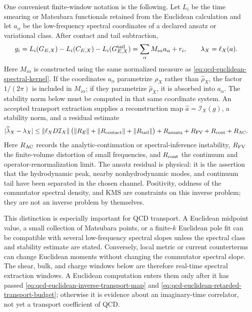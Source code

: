 \begin{controlledapproximation}
One convenient finite-window notation is the following.  Let \(L_i\) be the
time smearing or Matsubara functionals retained from the Euclidean
calculation and let \(a_\alpha\) be the low-frequency spectral coordinates
of a declared ansatz or variational class.  After contact and tail
subtraction,
\begin{equation}
  g_i
  =
  L_i(G_{E,X})-L_i(C_{E,X})-L_i(G_{E,X}^{\rm tail})
  =
  \sum_\alpha M_{i\alpha}a_\alpha+r_i,
  \qquad
  \lambda_X=\ell_X(a).
  \label{eq:qcd-euclidean-inverse-transport-map}
\end{equation}
Here \(M_{i\alpha}\) is constructed using the same normalized measure as
\eqref{eq:qcd-euclidean-spectral-kernel}.  If the coordinates \(a_\alpha\)
parametrize \(\rho_X\) rather than \(\widehat\rho_X\), the factor
\(1/(2\pi)\) is included in \(M_{i\alpha}\); if they parametrize
\(\widehat\rho_X\), it is absorbed into \(a_\alpha\).  The stability norm below
must be computed in that same coordinate system.
An accepted transport extraction supplies a reconstruction map
\(\widehat a=\mathcal I_X(g)\), a stability norm, and a residual estimate
\begin{equation}
  |\widehat\lambda_X-\lambda_X|
  \le
  \|\ell_X D\mathcal I_X\|\,
  \bigl(
    \|R_E\|+\|R_{\rm contact}\|+\|R_{\rm tail}\|
  \bigr)
  +
  R_{\rm ansatz}+R_{\rm FV}+R_{\rm cont}+R_{\rm AC}.
  \label{eq:qcd-euclidean-retarded-transport-budget}
\end{equation}
Here \(R_{\rm AC}\) records the analytic-continuation or spectral-inference
instability, \(R_{\rm FV}\) the finite-volume distortion of small
frequencies, and \(R_{\rm cont}\) the continuum and operator-renormalization
limit.  The ansatz residual is physical: it is the assertion that the
hydrodynamic peak, nearby nonhydrodynamic modes, and continuum tail have been
separated in the chosen channel.  Positivity, oddness of the commutator
spectral density, and KMS are constraints on this inverse problem; they are
not an inverse problem by themselves.

This distinction is especially important for QCD transport.  A Euclidean
midpoint value, a small collection of Matsubara points, or a finite-\(k\)
Euclidean pole fit can be compatible with several low-frequency spectral
slopes unless the spectral class and stability estimate are stated.
Conversely, local metric or current counterterms can change Euclidean
moments without changing the commutator spectral slope.  The shear, bulk,
and charge windows below are therefore real-time spectral extraction windows.  A
Euclidean computation enters them only after it has passed
\eqref{eq:qcd-euclidean-inverse-transport-map} and
\eqref{eq:qcd-euclidean-retarded-transport-budget}; otherwise it is evidence
about an imaginary-time correlator, not yet a transport coefficient of QCD.
\end{controlledapproximation}

